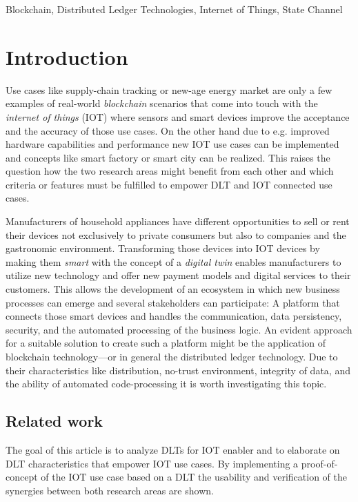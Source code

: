 \documentclass[conference]{IEEEtran}
\begin{document}
\begin{IEEEkeywords}
Blockchain, Distributed Ledger Technologies, Internet of Things, State Channel
\end{IEEEkeywords}

%
\section{Introduction}

Use cases like supply-chain tracking or new-age energy market are only a few examples of real-world \emph{blockchain} scenarios that come into touch with the \emph{internet of things} (IOT) where sensors and smart devices improve the acceptance and the accuracy of those use cases. On the other hand due to e.g. improved hardware capabilities and performance new IOT use cases can be implemented and concepts like smart factory or smart city can be realized. This raises the question how the two research areas might benefit from each other and which criteria or features must be fulfilled to empower DLT and IOT connected use cases.

Manufacturers of household appliances have different opportunities to sell or rent their devices not exclusively to private consumers but also to companies and the gastronomic environment. Transforming those devices into IOT devices by making them \emph{smart} with the concept of a \emph{digital twin} enables manufacturers to utilize new technology and offer new payment models and digital services to their customers. This allows the development of an ecosystem in which new business processes can emerge and several stakeholders can participate: A platform that connects those smart devices and handles the communication, data persistency, security, and the automated processing of the business logic. An evident approach for a suitable solution to create such a platform might be the application of blockchain technology---or in general the distributed ledger technology. Due to their characteristics like distribution, no-trust environment, integrity of data, and the ability of automated code-processing it is worth investigating this topic.

%
\subsection{Related work}

The goal of this article is to analyze DLTs for IOT enabler and to elaborate on DLT characteristics that empower IOT use cases. By implementing a proof-of-concept of the IOT use case based on a DLT the usability and verification of the synergies between both research areas are shown.
\end{document}
